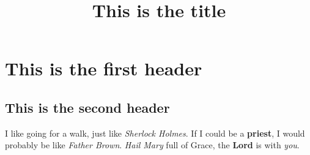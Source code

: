 \documentclass{article}
\title{This is the title}
\begin{document}
\maketitle
\section{ This is the first header}
\subsection{ This is the second header}
I like going for a walk, just like \textit{Sherlock Holmes}. If I could be a \textbf{priest}, I would probably be like \textit{Father Brown}. \textit{Hail Mary} full of Grace, the \textbf{Lord} is with \textit{you}.
\end{document}
